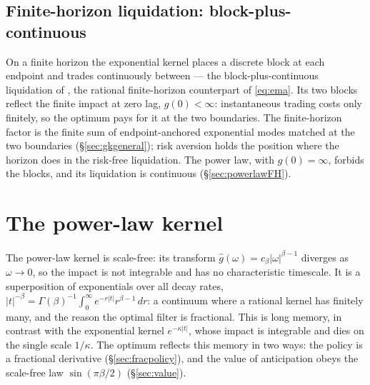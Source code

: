 \documentclass[11pt]{article}
\theoremstyle{plain}
\theoremstyle{definition}
\theoremstyle{remark}
\begin{document}
\subsection{Finite-horizon liquidation: block-plus-continuous}\label{sec:expFH}

On a finite horizon the exponential kernel places a discrete block at each endpoint and trades continuously between --- the block-plus-continuous liquidation of \citet{ObizhaevaWang2013}, the rational finite-horizon counterpart of \eqref{eq:ema}. Its two blocks reflect the finite impact at zero lag, $g(0)<\infty$: instantaneous trading costs only finitely, so the optimum pays for it at the two boundaries. The finite-horizon factor is the finite sum of endpoint-anchored exponential modes matched at the two boundaries (\S\ref{sec:gkgeneral}); risk aversion holds the position where the horizon does in the risk-free liquidation. The power law, with $g(0)=\infty$, forbids the blocks, and its liquidation is continuous (\S\ref{sec:powerlawFH}).

\section{The power-law kernel}\label{sec:fractional}

The power-law kernel is scale-free: its transform $\hat g(\omega)=c_\beta|\omega|^{\beta-1}$ diverges as $\omega\to0$, so the impact is not integrable and has no characteristic timescale. It is a superposition of exponentials over all decay rates, $|t|^{-\beta}=\Gamma(\beta)^{-1}\int_0^\infty e^{-r|t|}r^{\beta-1}\,dr$: a continuum where a rational kernel has finitely many, and the reason the optimal filter is fractional. This is long memory, in contrast with the exponential kernel $e^{-\kappa|t|}$, whose impact is integrable and dies on the single scale $1/\kappa$. The optimum reflects this memory in two ways: the policy is a fractional derivative (\S\ref{sec:fracpolicy}), and the value of anticipation obeys the scale-free law $\sin(\pi\beta/2)$ (\S\ref{sec:value}).
\end{document}
